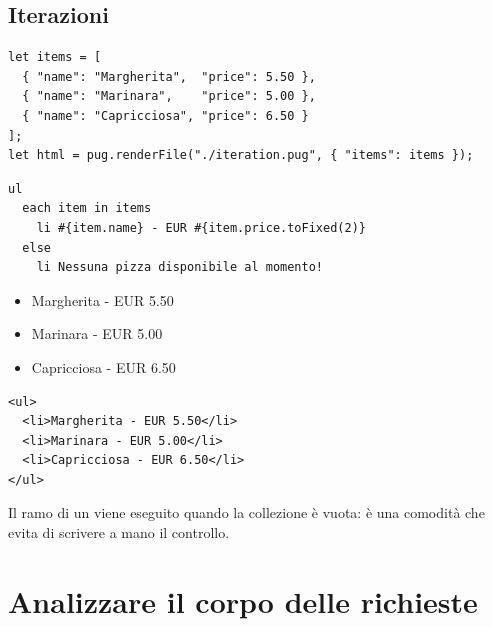 \subsection{Iterazioni}

\begin{lstlisting}[style=js]
let items = [
  { "name": "Margherita",  "price": 5.50 },
  { "name": "Marinara",    "price": 5.00 },
  { "name": "Capricciosa", "price": 6.50 }
];
let html = pug.renderFile("./iteration.pug", { "items": items });
\end{lstlisting}

\begin{affianco}[0.55][c]
\begin{lstlisting}[style=pug, name=iteration.pug]
ul
  each item in items
    li #{item.name} - EUR #{item.price.toFixed(2)}
  else
    li Nessuna pizza disponibile al momento!
\end{lstlisting}
\risultato
\begin{browser}[iteration]
  \begin{itemize}[leftmargin=1.8em, itemsep=0pt, topsep=2pt, parsep=0pt]
    \item Margherita - EUR 5.50
    \item Marinara - EUR 5.00
    \item Capricciosa - EUR 6.50
  \end{itemize}
\end{browser}
\end{affianco}

\begin{lstlisting}[style=html, name=output.html]
<ul>
  <li>Margherita - EUR 5.50</li>
  <li>Marinara - EUR 5.00</li>
  <li>Capricciosa - EUR 6.50</li>
</ul>
\end{lstlisting}

Il ramo  di un  viene eseguito quando la collezione è
vuota: è una comodità che evita di scrivere a mano il controllo.


\section{Analizzare il corpo delle richieste}

